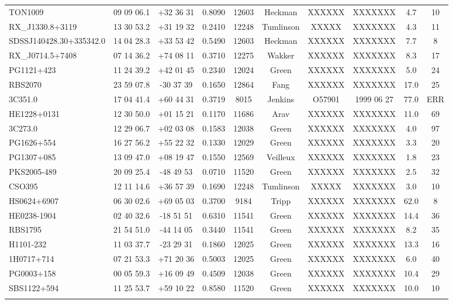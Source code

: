 \documentclass[iop]{emulateapj-rtx4}
\begin{document}
\begin{table}[ht]
\begin{center}
\begin{tabular}{l c c c c c c c c c}
 TON1009 				& 09 09 06.1  &  +32 36 31  &  0.8090 & 12603 & Heckman  & XXXXXX & XXXXXXX  &     4.7 &  10  \\
 RX\_J1330.8+3119 			& 13 30 53.2  &  +31 19 32  &  0.2410 & 12248	 & Tumlinson & XXXXX   & XXXXXXX  & 	  4.3 &  11  \\
 SDSSJ140428.30+335342.0 	& 14 04 28.3  &  +33 53 42 &  0.5490  & 12603	 & Heckman  & XXXXXX & XXXXXXX  &     7.7 &  8  \\
 RX\_J0714.5+7408 			& 07 14 36.2  &  +74 08 11  &  0.3710 & 12275 & Wakker      & XXXXXX & XXXXXXX  &     8.3 &  17  \\
 PG1121+423 				& 11 24 39.2  &  +42 01 45  &  0.2340 & 12024	 & Green	     & XXXXXX & XXXXXXX  &     5.0 & 24  \\
 RBS2070 				& 23 59 07.8  &  -30 37 39  &  0.1650  & 12864 & Fang	     & XXXXXX & XXXXXXX  &   17.0 &  25  \\
 3C351.0 					& 17 04 41.4  &  +60 44 31  &  0.3719 &  8015  & Jenkins      & O57901  & 1999 06 27 &  77.0 &  ERR  \\
 HE1228+0131 			& 12 30 50.0  &  +01 15 21  &  0.1170 & 11686 & Arav 	     & XXXXXX & XXXXXXX  &   11.0 &  69  \\
 3C273.0 					& 12 29 06.7  &  +02 03 08  &  0.1583 & 12038 & Green	     & XXXXXX & XXXXXXX  &     4.0 &  97  \\
 PG1626+554 				& 16 27 56.2  &  +55 22 32  &  0.1330 & 12029 & Green	     & XXXXXX & XXXXXXX  &     3.3 &  20  \\
 PG1307+085 				& 13 09 47.0  &  +08 19 47  &  0.1550 & 12569 & Veilleux     & XXXXXX & XXXXXXX  &     1.8 &  23  \\
 PKS2005-489 				& 20 09 25.4  &  -48 49 53   &  0.0710 & 11520 & Green 	     & XXXXXX & XXXXXXX  &     2.5 &  32  \\
 CSO395 					& 12 11 14.6  &  +36 57 39  &  0.1690 & 12248	 & Tumlinson & XXXXX   & XXXXXXX  & 	  3.0 &  10  \\
 HS0624+6907 			& 06 30 02.6  &  +69 05 03  &  0.3700 & 9184	 & Tripp 	     & XXXXXX & XXXXXXX  &   62.0 &  8  \\
 HE0238-1904 				& 02 40 32.6  &  -18 51 51   &  0.6310 & 11541 & Green	     & XXXXXX & XXXXXXX  &   14.4 &  36  \\
 RBS1795 				& 21 54 51.0  &  -44 14 05   &  0.3440 & 11541	 & Green	     & XXXXXX & XXXXXXX  &     8.2 &  35  \\
 H1101-232 				& 11 03 37.7  &  -23 29 31   &  0.1860 & 12025 & Green  	     & XXXXXX & XXXXXXX  &   13.3 &  16  \\
 1H0717+714 				& 07 21 53.3  &  +71 20 36  &  0.5003 & 12025	 & Green	     & XXXXXX & XXXXXXX  &     6.0 &  40  \\
 PG0003+158 				& 00 05 59.3  &  +16 09 49  &  0.4509 & 12038 & Green	     & XXXXXX & XXXXXXX  &   10.4 &  29  \\
 SBS1122+594 			& 11 25 53.7  &  +59 10 22  &  0.8580 & 11520	 & Green	     & XXXXXX & XXXXXXX  &   10.0 &  10  \\
 \\
\hline


\end{tabular}
\end{center}
\end{table}
\end{document}
